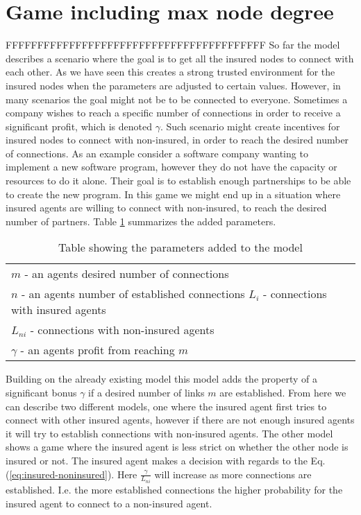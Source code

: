 

\section{Game including max node degree}

FFFFFFFFFFFFFFFFFFFFFFFFFFFFFFFFFFFFFFFFF
So far the model describes a scenario where the goal is to get all the insured nodes to connect with each other. As we have seen this creates a strong trusted environment for the insured nodes when the parameters are adjusted to certain values. However, in many scenarios the goal might not be to be connected to everyone. Sometimes a company wishes to reach a specific number of connections in order to receive a significant profit, which is denoted $\gamma$. Such scenario might create incentives for insured nodes to connect with non-insured, in order to reach the desired number of connections. As an example consider a software company wanting to implement a new software program, however they do not have the capacity or resources to do it alone. Their goal is to establish enough partnerships to be able to create the new program. In this game we might end up in a situation where insured agents are willing to connect with non-insured, to reach the desired number of partners. Table \ref{tbl:model3para} summarizes the added parameters. 

\begin{table}[h]
\centering
\begin{tabular}{lc}
 \hline
  $m$ - an agents desired number of connections\\
  $n$ - an agents number of established connections
  $L_{i}$ - connections with insured agents \\
  $L_{ni}$ - connections with non-insured agents\\
  $\gamma$ - an agents profit from reaching $m$ \\
  \hline
\end{tabular}
\caption{Table showing the parameters added to the model \label{tbl:model3para}}
\end{table}


Building on the already existing model this model adds the property of a significant bonus $\gamma$ if a desired number of links $m$ are established. From here we can describe two different models, one where the insured agent first tries to connect with other insured agents, however if there are not enough insured agents it will try to establish connections with non-insured agents. The other model shows a game where the insured agent is less strict on whether the other node is insured or not. The insured agent makes a decision with regards to the Eq.(\ref{eq:insured-noninsured}). Here $\frac{\gamma}{ L_{ni}}$ will increase as more connections are established. I.e. the more established connections the higher probability for the insured agent to connect to a non-insured agent.

